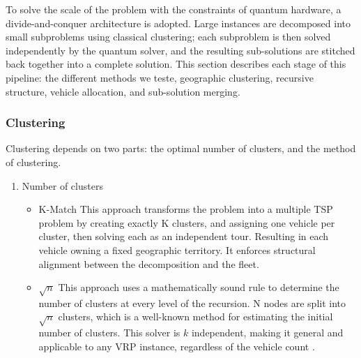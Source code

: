 \documentclass[a4paper]{report}
\begin{document}
{\begin{itemize}
To solve the scale of the problem with the constraints of quantum hardware, a divide-and-conquer architecture is adopted. Large instances are decomposed into small subproblems using classical clustering; each subproblem is then solved independently by the quantum solver, and the resulting sub-solutions are stitched back together into a complete solution. This section describes each stage of this pipeline: the different methods we teste, geographic clustering, recursive structure, vehicle allocation, and sub-solution merging.


\subsubsection{Clustering }
Clustering depends on two parts:  the optimal number of clusters, and the method of clustering.
\begin{enumerate}
    \item Number of clusters
    \begin{itemize}
        \item K-Match \newline
        This approach transforms the problem into a multiple TSP problem by creating exactly K clusters, and assigning one vehicle per cluster, then solving each as an independent tour. Resulting in each vehicle owning a fixed geographic territory. It enforces structural alignment between the decomposition and the fleet. 
        \item $\sqrt{n}$ \newline
        This approach uses a mathematically sound rule to determine the number of clusters at every level of the recursion. N nodes are split into $\sqrt{n}$ clusters, which is a well-known method for estimating the initial number of clusters. This solver is $k$  independent, making it general and applicable to any VRP instance, regardless of the vehicle count \cite{knn_lecture_scribd,brenndoerfer_ivf_2026}.
    \end{itemize}
    

\end{enumerate}
\end{itemize}}
\end{document}

